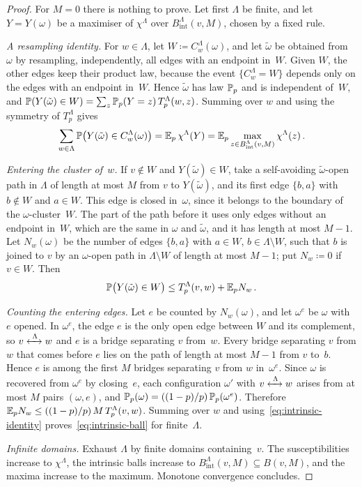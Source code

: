 \begin{proof}
For $M=0$ there is nothing to prove. Let first $\Lambda$ be finite, and let $Y=Y(\omega)$ be a maximiser
of $\chi^\Lambda$ over $B^\Lambda_{\mathrm{int}}(v,M)$, chosen by a fixed rule.

\emph{A resampling identity.} For $w\in\Lambda$, let $W\coloneqq C^\Lambda_w(\omega)$, and let
$\tilde\omega$ be obtained from $\omega$ by resampling, independently, all edges with an endpoint in~$W$.
Given $W$, the other edges keep their product law, because the event $\{C^\Lambda_w=W\}$ depends only on
the edges with an endpoint in~$W$. Hence $\tilde\omega$ has law $\mathbb P_p$ and is independent of~$W$, and
$\mathbb P(Y(\tilde\omega)\in W)=\sum_z\mathbb P_p(Y=z)\,T_p^\Lambda(w,z)$. Summing over $w$ and using the symmetry of
$T^\Lambda_p$ gives
\begin{equation}\label{eq:intrinsic-identity}
  \sum_{w\in\Lambda}\mathbb P\bigl(Y(\tilde\omega)\in C^\Lambda_w(\omega)\bigr)
  =\mathbb E_p\,\chi^\Lambda(Y)=\mathbb E_p\max_{z\in B^\Lambda_{\mathrm{int}}(v,M)}\chi^\Lambda(z)\,.
\end{equation}

\emph{Entering the cluster of~$w$.} If $v\notin W$ and $Y(\tilde\omega)\in W$, take a self-avoiding
$\tilde\omega$-open path in $\Lambda$ of length at most $M$ from $v$ to $Y(\tilde\omega)$, and its first
edge $\{b,a\}$ with $b\notin W$ and $a\in W$. This edge is closed in~$\omega$, since it belongs to the
boundary of the $\omega$-cluster~$W$. The part of the path before it uses only edges without an
endpoint in~$W$, which are the same in $\omega$ and $\tilde\omega$, and it has length at most $M-1$.
Let $N_w(\omega)$ be the number of edges $\{b,a\}$ with $a\in W$, $b\in\Lambda\setminus W$, such that
$b$ is joined to $v$ by an $\omega$-open path in $\Lambda\setminus W$ of length at most $M-1$; put
$N_w\coloneqq0$ if $v\in W$. Then
\begin{equation*}
  \mathbb P\bigl(Y(\tilde\omega)\in W\bigr)\le T^\Lambda_p(v,w)+\mathbb E_pN_w\,.
\end{equation*}

\emph{Counting the entering edges.} Let $e$ be counted by $N_w(\omega)$, and let $\omega^e$ be $\omega$
with $e$ opened. In $\omega^e$, the edge $e$ is the only open edge between $W$ and its complement, so
$v\xleftrightarrow{\;\Lambda\;}w$ and $e$ is a bridge separating $v$ from~$w$. Every bridge separating $v$ from $w$
that comes before $e$ lies on the path of length at most $M-1$ from $v$ to~$b$. Hence $e$ is among the
first $M$ bridges separating $v$ from $w$ in~$\omega^e$. Since $\omega$ is recovered from $\omega^e$ by
closing~$e$, each configuration $\omega'$ with $v\xleftrightarrow{\;\Lambda\;}w$ arises from at most $M$ pairs
$(\omega,e)$, and $\mathbb P_p(\omega)=((1-p)/p)\,\mathbb P_p(\omega^e)$. Therefore
$\mathbb E_pN_w\le((1-p)/p)\,M\,T_p^\Lambda(v,w)$. Summing over $w$ and using~\eqref{eq:intrinsic-identity}
proves~\eqref{eq:intrinsic-ball} for finite~$\Lambda$.

\emph{Infinite domains.} Exhaust $\Lambda$ by finite domains containing~$v$. The susceptibilities
increase to $\chi^\Lambda$, the intrinsic balls increase to $B^\Lambda_{\mathrm{int}}(v,M)\subseteq
B(v,M)$, and the maxima increase to the maximum. Monotone convergence concludes.
\end{proof}

